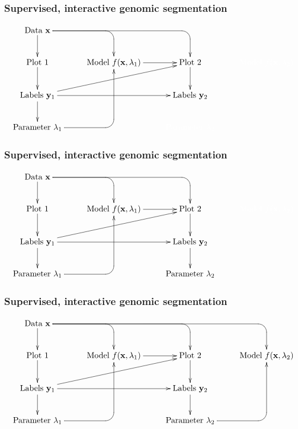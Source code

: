 \documentclass{beamer}
\begin{document}
\begin{frame}
  \frametitle{Supervised, interactive genomic segmentation}
  \small
  \begin{displaymath}
  \xymatrix{
    \text{Data $\mathbf x$}
    \ar `[r] [dr] 
    \ar `r[rr] [drr] 
    \ar [d]
    & \text{ }
    & \text{ }
    & \text{ }
    \\
    \text{Plot 1} 
    \ar [d]
    & 
    \text{Model $f(\mathbf x, \lambda_1)$} 
    \ar [r]
    &
    \text{Plot 2} 
    \ar [d]
    & 
    \color{white}{\text{Model $f(\mathbf x, \lambda_2)$} }
    \\
    \text{Labels $\mathbf y_1$}       
    \ar [d]
    \ar [rr]
    \ar [rru]
    &
    &
    \text{Labels $\mathbf y_2$}
    \\
    \text{Parameter $\lambda_1$} 
    \ar `r[ruu] [ruu]
    & \text{ }
    & 
    \color{white}{\text{Parameter $\lambda_2$}}
  }
  \end{displaymath}
\end{frame}

\begin{frame}
  \frametitle{Supervised, interactive genomic segmentation}
  \small
  \begin{displaymath}
  \xymatrix{
    \text{Data $\mathbf x$}
    \ar `[r] [dr] 
    \ar `r[rr] [drr] 
    \ar [d]
    & \text{ }
    & \text{ }
    & \text{ }
    \\
    \text{Plot 1} 
    \ar [d]
    & 
    \text{Model $f(\mathbf x, \lambda_1)$} 
    \ar [r]
    &
    \text{Plot 2} 
    \ar [d]
    & 
    \color{white}{\text{Model $f(\mathbf x, \lambda_2)$} }
    \\
    \text{Labels $\mathbf y_1$}       
    \ar [d]
    \ar [rr]
    \ar [rru]
    &
    &
    \text{Labels $\mathbf y_2$}
    \ar [d]
    \\
    \text{Parameter $\lambda_1$} 
    \ar `r[ruu] [ruu]
    & \text{ }
    & \text{Parameter $\lambda_2$}
  }
  \end{displaymath}
\end{frame}


\begin{frame}
  \frametitle{Supervised, interactive genomic segmentation}
  \small
  \begin{displaymath}
  \xymatrix{
    \text{Data $\mathbf x$}
    \ar `[r] [dr] 
    \ar `r[rr] [drr] 
    \ar `r[rrr] [drrr] 
    \ar [d]
    & \text{ }
    & \text{ }
    & \text{ }
    \\
    \text{Plot 1} 
    \ar [d]
    & 
    \text{Model $f(\mathbf x, \lambda_1)$} 
    \ar [r]
    &
    \text{Plot 2} 
    \ar [d]
    & 
    \text{Model $f(\mathbf x, \lambda_2)$} 
    \\
    \text{Labels $\mathbf y_1$}       
    \ar [d]
    \ar [rr]
    \ar [rru]
    &
    &
    \text{Labels $\mathbf y_2$}
    \ar [d]
    \\
    \text{Parameter $\lambda_1$} 
    \ar `r[ruu] [ruu]
    & \text{ }
    & \text{Parameter $\lambda_2$}
    \ar `r[ruu] [ruu]
  }
  \end{displaymath}
\end{frame}
\end{document}
